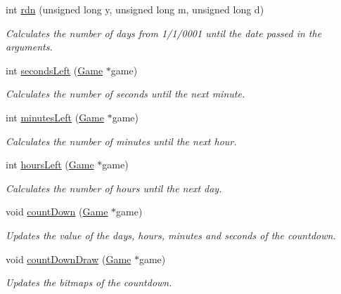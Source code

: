 \begin{DoxyCompactItemize}
int \hyperlink{group___graphics_ga0e4bd2e0f0b7e0074f5c00a2373ef7b8}{rdn} (unsigned long y, unsigned long m, unsigned long d)
\begin{DoxyCompactList}\small\item\em Calculates the number of days from 1/1/0001 until the date passed in the arguments. \end{DoxyCompactList}\item 
int \hyperlink{group___graphics_gad894cc2aa0d11dd0d068a26a970568c0}{seconds\+Left} (\hyperlink{struct_game}{Game} $\ast$game)
\begin{DoxyCompactList}\small\item\em Calculates the number of seconds until the next minute. \end{DoxyCompactList}\item 
int \hyperlink{group___graphics_ga9c96c725c4779f2b277be96d399752c0}{minutes\+Left} (\hyperlink{struct_game}{Game} $\ast$game)
\begin{DoxyCompactList}\small\item\em Calculates the number of minutes until the next hour. \end{DoxyCompactList}\item 
int \hyperlink{group___graphics_gaa4e1ad5e2668cefab925f9151e82cf56}{hours\+Left} (\hyperlink{struct_game}{Game} $\ast$game)
\begin{DoxyCompactList}\small\item\em Calculates the number of hours until the next day. \end{DoxyCompactList}\item 
void \hyperlink{group___graphics_ga84e0c347e163833410a8df9d914402fa}{count\+Down} (\hyperlink{struct_game}{Game} $\ast$game)
\begin{DoxyCompactList}\small\item\em Updates the value of the days, hours, minutes and seconds of the countdown. \end{DoxyCompactList}\item 
void \hyperlink{group___graphics_gaadff1c974f62a2b8f18fde71535809fb}{count\+Down\+Draw} (\hyperlink{struct_game}{Game} $\ast$game)
\begin{DoxyCompactList}\small\item\em Updates the bitmaps of the countdown. \end{DoxyCompactList}\end{DoxyCompactItemize}
